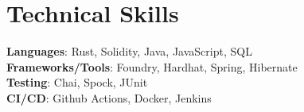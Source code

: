 \documentclass[letterpaper,11pt]{article}
\begin{document}
%
\section{Technical Skills}
\begin{itemize}[leftmargin=0.15in, label={}]
\small{\item{
\textbf{Languages}{: Rust, Solidity, Java, JavaScript, SQL} \\
\textbf{Frameworks/Tools}{: Foundry, Hardhat, Spring, Hibernate} \\
\textbf{Testing}{: Chai, Spock, JUnit} \\
\textbf{CI/CD}{: Github Actions, Docker, Jenkins} \\
}}
\end{itemize}


\end{document}
